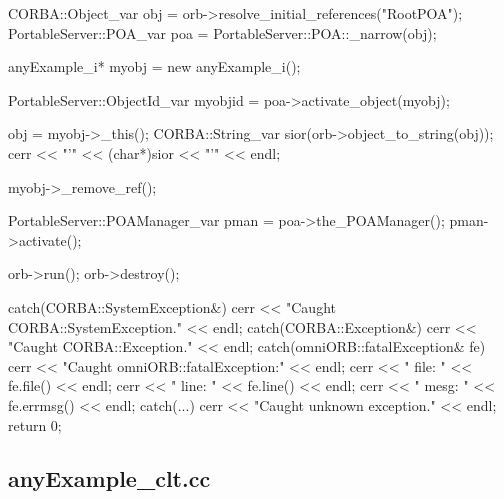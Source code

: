 \documentclass[11pt,twoside,a4paper]{book}
\begin{document}
\begin{cxxlisting}
{{    CORBA::Object_var obj = orb->resolve_initial_references("RootPOA");
    PortableServer::POA_var poa = PortableServer::POA::_narrow(obj);

    anyExample_i* myobj = new anyExample_i();

    PortableServer::ObjectId_var myobjid = poa->activate_object(myobj);

    obj = myobj->_this();
    CORBA::String_var sior(orb->object_to_string(obj));
    cerr << "'" << (char*)sior << "'" << endl;

    myobj->_remove_ref();

    PortableServer::POAManager_var pman = poa->the_POAManager();
    pman->activate();

    orb->run();
    orb->destroy();
  }
  catch(CORBA::SystemException&) {
    cerr << "Caught CORBA::SystemException." << endl;
  }
  catch(CORBA::Exception&) {
    cerr << "Caught CORBA::Exception." << endl;
  }
  catch(omniORB::fatalException& fe) {
    cerr << "Caught omniORB::fatalException:" << endl;
    cerr << "  file: " << fe.file() << endl;
    cerr << "  line: " << fe.line() << endl;
    cerr << "  mesg: " << fe.errmsg() << endl;
  }
  catch(...) {
    cerr << "Caught unknown exception." << endl;
  }
  return 0;
}
\end{cxxlisting}


\clearpage

\subsection{anyExample\_clt.cc}
\end{document}
